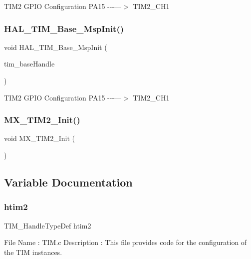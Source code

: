 T\+I\+M2 G\+P\+IO Configuration P\+A15 -\/-\/-\/---$>$ T\+I\+M2\+\_\+\+C\+H1\mbox{\label{tim_8c_a59716af159bfbbb6023b31354fb23af8}} 
\subsubsection{H\+A\+L\+\_\+\+T\+I\+M\+\_\+\+Base\+\_\+\+Msp\+Init()}
{\footnotesize\ttfamily void H\+A\+L\+\_\+\+T\+I\+M\+\_\+\+Base\+\_\+\+Msp\+Init (\begin{DoxyParamCaption}\item[{T\+I\+M\+\_\+\+Handle\+Type\+Def $\ast$}]{tim\+\_\+base\+Handle }\end{DoxyParamCaption})}

T\+I\+M2 G\+P\+IO Configuration P\+A15 -\/-\/-\/---$>$ T\+I\+M2\+\_\+\+C\+H1\mbox{\label{tim_8c_a4b8ff887fd3fdf26605e35927e4ff202}} 
\subsubsection{M\+X\+\_\+\+T\+I\+M2\+\_\+\+Init()}
{\footnotesize\ttfamily void M\+X\+\_\+\+T\+I\+M2\+\_\+\+Init (\begin{DoxyParamCaption}\item[{void}]{ }\end{DoxyParamCaption})}



\subsection{Variable Documentation}
\mbox{\label{tim_8c_a2c80fd5510e2990a59a5c90d745c716c}} 
\subsubsection{htim2}
{\footnotesize\ttfamily T\+I\+M\+\_\+\+Handle\+Type\+Def htim2}

File Name \+: T\+I\+M.\+c Description \+: This file provides code for the configuration of the T\+IM instances.

